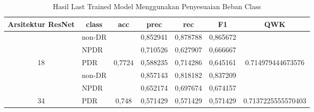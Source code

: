     \begin{table}[hbtp]
        \begin{center}
        \caption{Hasil Last Trained Model Menggunakan Penyesuaian Beban Class}
        \label{tb:HasilLastClassWeight}
        \begin{tabular}{|c|l|c|l|l|l|c|}
            \hline
            \rowcolor[HTML]{C0C0C0} 
            Arsitektur ResNet     & \multicolumn{1}{c|}{\cellcolor[HTML]{C0C0C0}class} & acc                      & \multicolumn{1}{c|}{\cellcolor[HTML]{C0C0C0}prec} & \multicolumn{1}{c|}{\cellcolor[HTML]{C0C0C0}rec} & \multicolumn{1}{c|}{\cellcolor[HTML]{C0C0C0}F1} & QWK                                  \\ \hline
                                  & non-DR                                             &                          & 0,852941                                          & 0,878788                                         & 0,865672                                        &                                      \\ \cline{2-2} \cline{4-6}
                                  & NPDR                                               &                          & 0,710526                                          & 0,627907                                         & 0,666667                                        &                                      \\ \cline{2-2} \cline{4-6}
            \multirow{-3}{*}{18}  & PDR                                                & \multirow{-3}{*}{0,7724} & 0,588235                                          & 0,714286                                         & 0,645161                                        & \multirow{-3}{*}{0.714979444673576}  \\ \hline
                                  & non-DR                                             &                          & 0,857143                                          & 0,818182                                         & 0,837209                                        &                                      \\ \cline{2-2} \cline{4-6}
                                  & NPDR                                               &                          & 0,652174                                          & 0,697674                                         & 0,674157                                        &                                      \\ \cline{2-2} \cline{4-6}
            \multirow{-3}{*}{34}  & PDR                                                & \multirow{-3}{*}{0,748}  & 0,571429                                          & 0,571429                                         & 0,571429                                        & \multirow{-3}{*}{0.7137225555570403} \\ \hline

\end{tabular}
\end{center}
\end{table}
